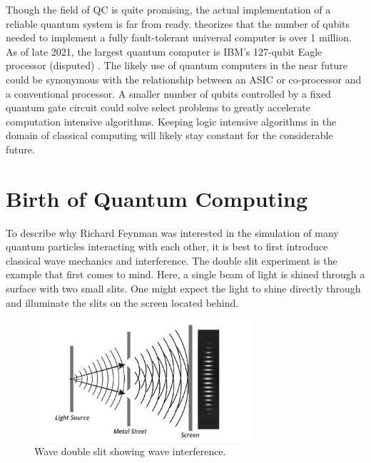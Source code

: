 \documentclass[conference]{IEEEtran}
\begin{document}
Though the field of QC is quite promising, the actual implementation of a reliable quantum system is far from ready. \cite{b1} theorizes that the number of qubits needed to implement a fully fault-tolerant universal computer is over 1 million. As of late 2021, the largest quantum computer is IBM's 127-qubit Eagle processor (disputed) \cite{b3}. The likely use of quantum computers in the near future could be synonymous with the relationship between an ASIC or co-processor and a conventional processor. A smaller number of qubits controlled by a fixed quantum gate circuit could solve select problems to greatly accelerate computation intensive algorithms. Keeping logic intensive algorithms in the domain of classical computing will likely stay constant for the considerable future. 

\section{Birth of Quantum Computing}

To describe why Richard Feynman was interested in the simulation of many quantum particles interacting with each other, it is best to first introduce classical wave mechanics and interference. The double slit experiment is the example that first comes to mind. Here, a single beam of light is shined through a surface with two small slits. One might expect the light to shine directly through and illuminate the slits on the screen located behind.

\begin{figure}[htbp]
\centerline{\includegraphics[width=8cm]{double_slit_wave}}
\caption{Wave double slit showing wave interference.}
\label{wave_slit}
\end{figure}
\end{document}
